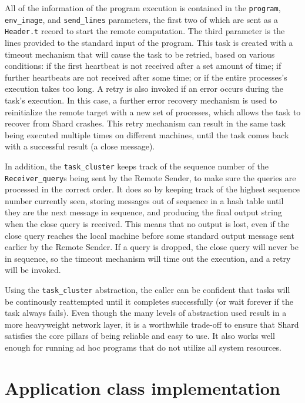 \documentclass[twoside]{report}
\begin{document}
All of the information of the program execution is contained in the \texttt{program}, \texttt{env\_image}, and \texttt{send\_lines} parameters, the first two of which are sent as a \texttt{Header.t} record to start the remote computation. The third parameter is the lines provided to the standard input of the program.
This task is created with a timeout mechanism that will cause the task to be retried, based on various conditions: if the first heartbeat is not received after a set amount of time; if further heartbeats are not received after some time; or if the entire processes's execution takes too long.
A retry is also invoked if an error occurs during the task's execution.
In this case, a further error recovery mechanism is used to reinitialize the remote target with a new set of processes, which allows the task to recover from Shard crashes.
This retry mechanism can result in the same task being executed multiple times on different machines, until the task comes back with a successful result (a close message).

In addition, the \texttt{task\_cluster} keeps track of the sequence number of the \texttt{Receiver\_query}s being sent by the Remote Sender, to make sure the queries are processed in the correct order.
It does so by keeping track of the highest sequence number currently seen, storing messages out of sequence in a hash table until they are the next message in sequence, and producing the final output string when the close query is received.
This means that no output is lost, even if the close query reaches the local machine before some standard output message sent earlier by the Remote Sender.
If a query is dropped, the close query will never be in sequence, so the timeout mechanism will time out the execution, and a retry will be invoked.

Using the \texttt{task\_cluster} abstraction, the caller can be confident that tasks will be continously reattempted until it completes successfully (or wait forever if the task always fails).
Even though the many levels of abstraction used result in a more heavyweight network layer, it is a worthwhile trade-off to ensure that Shard satisfies the core pillars of being reliable and easy to use. It also works well enough for running ad hoc programs that do not utilize all system resources.

\section{Application class implementation}
\end{document}

